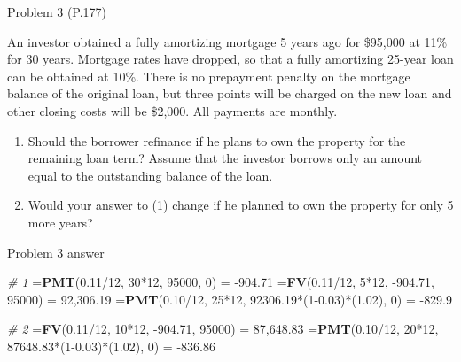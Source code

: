 \documentclass[ignorenonframetext,]{beamer}
\newenvironment{Shaded}{\begin{snugshade}}{\end{snugshade}}
\newcommand{\KeywordTok}[1]{\textcolor[rgb]{0.13,0.29,0.53}{\textbf{{#1}}}}
\newcommand{\DecValTok}[1]{\textcolor[rgb]{0.00,0.00,0.81}{{#1}}}
\newcommand{\FloatTok}[1]{\textcolor[rgb]{0.00,0.00,0.81}{{#1}}}
\newcommand{\StringTok}[1]{\textcolor[rgb]{0.31,0.60,0.02}{{#1}}}
\newcommand{\CommentTok}[1]{\textcolor[rgb]{0.56,0.35,0.01}{\textit{{#1}}}}
\newcommand{\NormalTok}[1]{{#1}}
\providecommand{\tightlist}{%
\setlength{\itemsep}{0pt}\setlength{\parskip}{0pt}}
\begin{document}
\begin{frame}{Problem 3 (P.177)}

An investor obtained a fully amortizing mortgage 5 years ago for
\$95,000 at 11\% for 30 years. Mortgage rates have dropped, so that a
fully amortizing 25-year loan can be obtained at 10\%. There is no
prepayment penalty on the mortgage balance of the original loan, but
three points will be charged on the new loan and other closing costs
will be \$2,000. All payments are monthly.

\begin{enumerate}
\def\labelenumi{\alph{enumi}.}
\tightlist
\item
  Should the borrower refinance if he plans to own the property for the
  remaining loan term? Assume that the investor borrows only an amount
  equal to the outstanding balance of the loan.
\item
  Would your answer to (1) change if he planned to own the property for
  only 5 more years?
\end{enumerate}

\small

\end{frame}

\begin{frame}[fragile]{Problem 3 answer}

\begin{Shaded}
\begin{Highlighting}[]
\CommentTok{# 1}
\NormalTok{=}\KeywordTok{PMT}\NormalTok{(}\FloatTok{0.11}\NormalTok{/}\DecValTok{12}\NormalTok{, }\DecValTok{30}\NormalTok{*}\DecValTok{12}\NormalTok{, }\DecValTok{95000}\NormalTok{, }\DecValTok{0}\NormalTok{) =}\StringTok{ }\NormalTok{-}\FloatTok{904.71}
\NormalTok{=}\KeywordTok{FV}\NormalTok{(}\FloatTok{0.11}\NormalTok{/}\DecValTok{12}\NormalTok{, }\DecValTok{5}\NormalTok{*}\DecValTok{12}\NormalTok{, -}\FloatTok{904.71}\NormalTok{, }\DecValTok{95000}\NormalTok{) =}\StringTok{ }\DecValTok{92}\NormalTok{,}\FloatTok{306.19}
\NormalTok{=}\KeywordTok{PMT}\NormalTok{(}\FloatTok{0.10}\NormalTok{/}\DecValTok{12}\NormalTok{, }\DecValTok{25}\NormalTok{*}\DecValTok{12}\NormalTok{, }\FloatTok{92306.19}\NormalTok{*(}\DecValTok{1}\FloatTok{-0.03}\NormalTok{)*(}\FloatTok{1.02}\NormalTok{), }\DecValTok{0}\NormalTok{) =}
\StringTok{  }\NormalTok{-}\FloatTok{829.9}

\CommentTok{# 2}
\NormalTok{=}\KeywordTok{FV}\NormalTok{(}\FloatTok{0.11}\NormalTok{/}\DecValTok{12}\NormalTok{, }\DecValTok{10}\NormalTok{*}\DecValTok{12}\NormalTok{, -}\FloatTok{904.71}\NormalTok{, }\DecValTok{95000}\NormalTok{) =}\StringTok{ }\DecValTok{87}\NormalTok{,}\FloatTok{648.83}
\NormalTok{=}\KeywordTok{PMT}\NormalTok{(}\FloatTok{0.10}\NormalTok{/}\DecValTok{12}\NormalTok{, }\DecValTok{20}\NormalTok{*}\DecValTok{12}\NormalTok{, }\FloatTok{87648.83}\NormalTok{*(}\DecValTok{1}\FloatTok{-0.03}\NormalTok{)*(}\FloatTok{1.02}\NormalTok{), }\DecValTok{0}\NormalTok{) =}\StringTok{ }
\StringTok{  }\NormalTok{-}\FloatTok{836.86}
\end{Highlighting}
\end{Shaded}

\end{frame}
\end{document}
